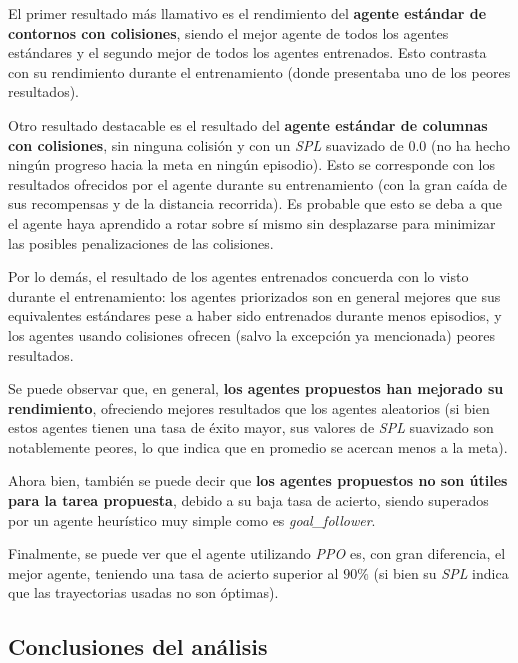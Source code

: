 \newpage

El primer resultado más llamativo es el rendimiento del \textbf{agente estándar de contornos con colisiones}, siendo el mejor agente de todos los agentes estándares y el segundo mejor de todos los agentes entrenados. Esto contrasta con su rendimiento durante el entrenamiento (donde presentaba uno de los peores resultados).

Otro resultado destacable es el resultado del \textbf{agente estándar de columnas con colisiones}, sin ninguna colisión y con un \textit{SPL} suavizado de 0.0 (no ha hecho ningún progreso hacia la meta en ningún episodio). Esto se corresponde con los resultados ofrecidos por el agente durante su entrenamiento (con la gran caída de sus recompensas y de la distancia recorrida). Es probable que esto se deba a que el agente haya aprendido a rotar sobre sí mismo sin desplazarse para minimizar las posibles penalizaciones de las colisiones.

Por lo demás, el resultado de los agentes entrenados concuerda con lo visto durante el entrenamiento: los agentes priorizados son en general mejores que sus equivalentes estándares pese a haber sido entrenados durante menos episodios, y los agentes usando colisiones ofrecen (salvo la excepción ya mencionada) peores resultados.

Se puede observar que, en general, \textbf{los agentes propuestos han mejorado su rendimiento}, ofreciendo mejores resultados que los agentes aleatorios (si bien estos agentes tienen una tasa de éxito mayor, sus valores de \textit{SPL} suavizado son notablemente peores, lo que indica que en promedio se acercan menos a la meta).

Ahora bien, también se puede decir que \textbf{los agentes propuestos no son útiles para la tarea propuesta}, debido a su baja tasa de acierto, siendo superados por un agente heurístico muy simple como es \textit{goal{\_}follower}.

Finalmente, se puede ver que el agente utilizando \textit{PPO} es, con gran diferencia, el mejor agente, teniendo una tasa de acierto superior al $90\%$ (si bien su \textit{SPL} indica que las trayectorias usadas no son óptimas).

\subsection{Conclusiones del análisis}

